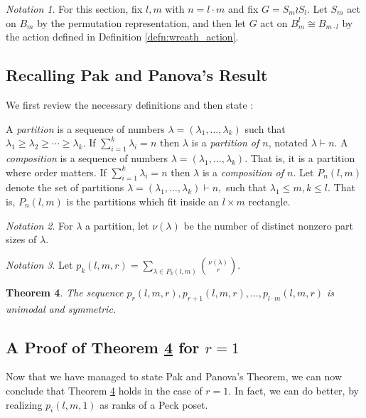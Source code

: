 \documentclass[10 pt]{amsart}
\theoremstyle{plain}
\newtheorem{thm}{Theorem}[section]
\theoremstyle{definition}
\theoremstyle{remark}
\newtheorem{note}[thm]{Notation}
\numberwithin{equation}{section}
\newcommand\ssec{\subsection}
\begin{document}
\begin{note}
For this section, fix $l,m$ with $n = l \cdot m$ and fix $G = S_m \wr S_l.$ Let $S_m$ act on $B_m$ by the permutation representation, and then let $G$ act on $B_{m}^l\cong B_{m \cdot l}$ by the action defined in Definition \ref{defn:wreath_action}.
\end{note}

\ssec{Recalling Pak and Panova's Result}
We first review the necessary definitions and then state \cite[Theorem 1.1]{pak}:

A {\it partition} is a sequence of numbers $\lambda = (\lambda_1,\ldots, \lambda_k)$ such that $\lambda_1 \geq \lambda_2 \geq \cdots \geq \lambda_k.$ If $\sum_{i=1}^k \lambda_i = n$ then $\lambda$ is a {\it partition of $n$}, notated $\lambda \vdash n.$ A {\it composition} is a sequence of numbers $\lambda = (\lambda_1,\ldots, \lambda_k).$ That is, it is a partition where order matters. If $\sum_{i=1}^k \lambda_i = n$ then $\lambda$ is a {\it composition of $n$}. Let $P_n(l,m)$ denote the set of partitions $\lambda = (\lambda_1,\ldots, \lambda_k) \vdash n,$ such that $\lambda_1 \leq m,k \leq l.$ That is, $P_n(l,m)$ is the partitions which fit inside an $l \times m$ rectangle.

\begin{note}
\cite[Section 1]{pak} For $\lambda$ a partition, let $\nu(\lambda)$ be the number of distinct nonzero part sizes of $\lambda.$
\end{note}

\begin{note}
\cite[Section 1]{pak}
Let $p_k(l,m,r) = \sum_{\lambda \in P_k(l,m)} \binom{\nu(\lambda)}{r}.$
\end{note}

\begin{thm}
\label{thm:pak_thm}
\cite[Theorem 1.1]{pak}
The sequence $p_r(l,m,r), p_{r+1}(l,m,r),\ldots, p_{l\cdot m}(l,m,r)$ is unimodal and symmetric.
\end{thm}

\ssec{A Proof of Theorem \ref{thm:pak_thm} for $r = 1$}
Now that we have managed to state Pak and Panova's Theorem, we can now conclude that Theorem \ref{thm:pak_thm} holds in the case of $r=1.$ In fact, we can do better, by realizing $p_i(l,m,1)$ as ranks of a Peck poset.
\end{document}
